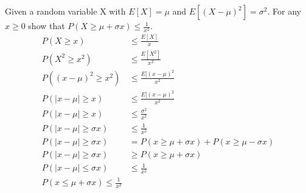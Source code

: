 \section{}

Given a random variable X with $E[X]=\mu$ and $E[(X-\mu)^2]=\sigma^2$. For any $x\geq0$ show that $P(X\geq \mu + \sigma x) \leq \frac{1}{x^2}$.
\begin{align*}
    P(X \geq x) &\leq \frac{E[X]}{x} \\	
    P(X^2 \geq x^2) &\leq \frac{E[X^2]}{x^2} \\
    P((x - \mu)^2 \geq x^2) &\leq \frac{E[(x - \mu)^2}{x^2} \\
    P(|x - \mu| \geq x) &\leq \frac{E[(x - \mu)^2}{x^2} \\
    P(|x - \mu| \geq x) &\leq \frac{\sigma^2}{x^2} \\
    P(|x - \mu| \geq \sigma x) &\leq \frac{1}{x^2} \\
    P(|x - \mu| \geq \sigma x) &= P(x \geq \mu + \sigma x) + P(x \geq \mu - \sigma x) \\ %
    P(|x - \mu| \geq \sigma x) &\geq P(x \geq \mu + \sigma x) \\
    P(|x - \mu| \leq \sigma x) &\leq \frac{1}{x^2} \\
    P(x \leq \mu + \sigma x) \leq \frac{1}{x^2} \\
\end{align*}

